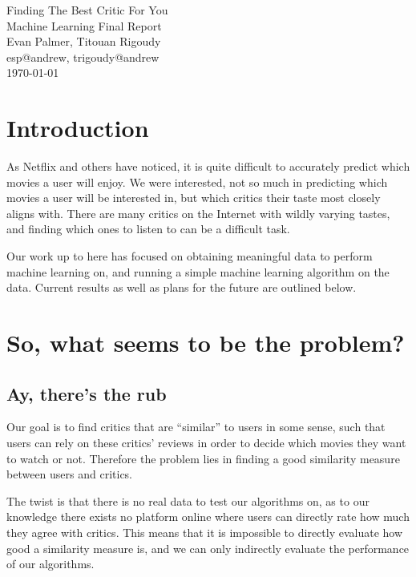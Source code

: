 \documentclass[12pt]{article}
\makeatletter
\newcommand{\myname}{Evan Palmer, Titouan Rigoudy}
\newcommand{\myandrew}{esp@andrew, trigoudy@andrew}
\newcommand{\thedate}{\today}
\makeatother
\begin{document}
	\medskip    
	\thispagestyle{plain}
	\begin{center}                 
	{\LARGE Finding The Best Critic For You} \\
	\medskip
	Machine Learning Final Report \\
	\smallskip
	\myname \\
	\myandrew \\
	\thedate \\
	\end{center}
	\vspace{0.5cm}

\section{Introduction}

As Netflix and others have noticed, it is quite difficult to accurately predict which movies a user will enjoy. We were interested, not so much in predicting which movies a user will be interested in, but which critics their taste most closely aligns with. There are many critics on the Internet with wildly varying tastes, and finding which ones to listen to can be a difficult task.

Our work up to here has focused on obtaining meaningful data to perform machine learning on, and running a simple machine learning algorithm on the data. Current results as well as plans for the future are outlined below.

\section{So, what seems to be the problem?}

\subsection{Ay, there's the rub} %

Our goal is to find critics that are ``similar'' to users in some sense, such
that users can rely on these critics' reviews in order to decide which movies
they want to watch or not. Therefore the problem lies in finding a good
similarity measure between users and critics.

The twist is that there is no real data to test our algorithms on, as to our
knowledge there exists no platform online where users can directly rate how
much they agree with critics. This means that it is impossible to directly
evaluate how good a similarity measure is, and we can only indirectly evaluate
the performance of our algorithms.
\end{document}

